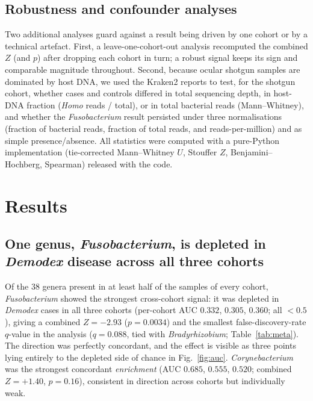 \documentclass[11pt]{article}
\newcommand{\demodex}{\textit{Demodex}}
\begin{document}
\subsection{Robustness and confounder analyses}
Two additional analyses guard against a result being driven by one cohort or by a
technical artefact. First, a leave-one-cohort-out analysis recomputed the combined
$Z$ (and $p$) after dropping each cohort in turn; a robust signal keeps its sign
and comparable magnitude throughout. Second, because ocular shotgun samples are
dominated by host DNA, we used the Kraken2 reports to test, for the shotgun
cohort, whether cases and controls differed in total sequencing depth, in host-DNA
fraction (\textit{Homo} reads / total), or in total bacterial reads (Mann--Whitney),
and whether the \textit{Fusobacterium} result persisted under three
normalisations (fraction of bacterial reads, fraction of total reads, and
reads-per-million) and as simple presence/absence. All statistics were computed
with a pure-Python implementation (tie-corrected Mann--Whitney $U$, Stouffer $Z$,
Benjamini--Hochberg, Spearman) released with the code.

\section{Results}

\subsection{One genus, \textit{Fusobacterium}, is depleted in \demodex{} disease
across all three cohorts}
Of the 38 genera present in at least half of the samples of every cohort,
\textit{Fusobacterium} showed the strongest cross-cohort signal: it was depleted
in \demodex{} cases in all three cohorts (per-cohort AUC $0.332$, $0.305$,
$0.360$; all $<0.5$), giving a combined $Z=-2.93$ ($p=0.0034$) and the smallest
false-discovery-rate $q$-value in the analysis ($q=0.088$, tied with
\textit{Bradyrhizobium}; Table~\ref{tab:meta}). The direction was perfectly
concordant, and the effect is visible as three points lying entirely to the
depleted side of chance in Fig.~\ref{fig:auc}. \textit{Corynebacterium} was the
strongest concordant \emph{enrichment} (AUC $0.685$, $0.555$, $0.520$; combined
$Z=+1.40$, $p=0.16$), consistent in direction across cohorts but individually
weak.
\end{document}
